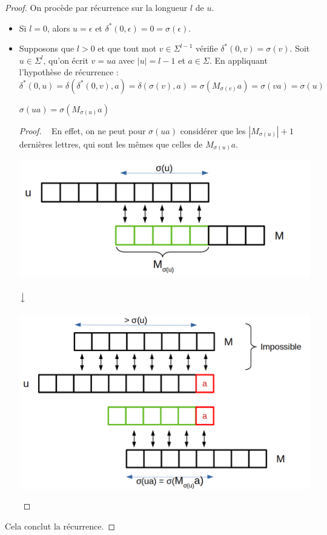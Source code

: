 \begin{proof}
On procède par récurrence sur la longueur $l$ de $u$.
\begin{itemize}[label =$\bullet$]
\item Si $l=0$, alors $u=\epsilon$ et $\delta^*(0,\epsilon) =0 = \sigma(\epsilon)$.
\item Supposons que $l>0$ et que tout mot $v\in \Sigma^{l-1}$ vérifie $\delta^*(0,v) = \sigma(v)$. Soit $u\in \Sigma^l$, qu'on écrit $v=ua$ avec $|u|=l-1$ et $a\in \Sigma$. En appliquant l'hypothèse de récurrence :
$$
\delta^*(0,u) =\delta(\delta^*(0,v),a) = \delta(\sigma(v),a) = \sigma \left( M_{\sigma(v)}a\right) = \sigma(va) = \sigma(u)
$$

\begin{lemma}
	$\sigma(ua) =\sigma(M_{\sigma(u)}a)$
\end{lemma}
\begin{proof}~
	En effet, on ne peut pour $\sigma(ua)$ considérer que les $\left| M_{\sigma(u)} \right| + 1$ dernières lettres, qui sont les mêmes que celles de $M_{\sigma (u)}a$.\\
	\begin{center}
		\includegraphics[scale=0.3]{nouveau_dev/Recherche de motif/cas_sans_a.png}\\ \enspace \\
		$\big\downarrow$\\ \enspace \\
		\includegraphics[scale=0.3]{nouveau_dev/Recherche de motif/cas_avec_a.png}
	\end{center}
\end{proof}
\end{itemize}
Cela conclut la récurrence.
\end{proof}


